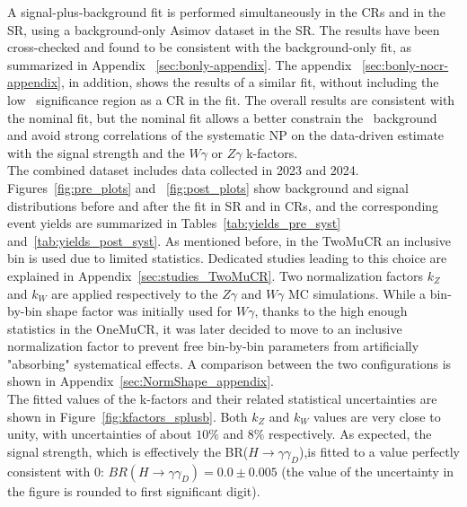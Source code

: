 A signal-plus-background fit is performed simultaneously in the CRs and in the SR, using a background-only Asimov dataset in the SR. The results have been cross-checked and found to be consistent with the background-only fit, as summarized in Appendix ~\ref{sec:bonly-appendix}. The appendix ~\ref{sec:bonly-nocr-appendix}, in addition, shows the results of a similar fit, without including the low \ETmiss\ significance region as a CR in the fit. The overall results are consistent with the nominal fit, but the nominal fit allows a better constrain the \jfakey\ background and avoid strong correlations of the systematic NP on the data-driven estimate with the signal strength and the $W\gamma$ or $Z\gamma$ k-factors. \\
The combined dataset includes data collected in 2023 and 2024.\\
Figures~\ref{fig:pre_plots} and ~\ref{fig:post_plots} show background and signal distributions before and after the fit in SR and in CRs, and the corresponding event yields are summarized in Tables~\ref{tab:yields_pre_syst} and~\ref{tab:yields_post_syst}. As mentioned before, in the TwoMuCR an inclusive bin is used due to limited statistics. Dedicated studies leading to this choice are explained in Appendix~\ref{sec:studies_TwoMuCR}.
Two normalization factors $k_Z$ and $k_W$ are applied respectively to the $Z\gamma$ and $W\gamma$ MC simulations. While a bin-by-bin shape factor was initially used for $W\gamma$, thanks to the high enough statistics in the OneMuCR, it was later decided to move to an inclusive normalization factor to prevent free bin-by-bin parameters from artificially "absorbing" systematical effects. A comparison between the two configurations is shown in Appendix~\ref{sec:NormShape_appendix}.\\
The fitted values of the k-factors and their related statistical uncertainties are shown in Figure~\ref{fig:kfactors_splusb}. Both $k_Z$ and $k_W$ values are very close to unity, with uncertainties of about $10\%$ and $8\%$ respectively. As expected, the signal strength, which is effectively the BR($H\to\gamma\gamma_D$),is fitted to a value perfectly consistent with 0: $BR(H\to\gamma\gamma_D)=0.0\pm 0.005$ (the value of the uncertainty in the figure is rounded to first significant digit).\\

